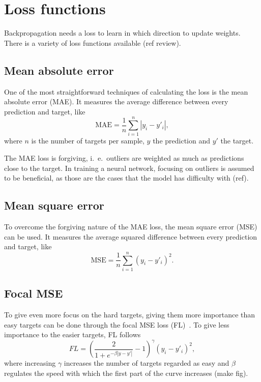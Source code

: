 
\section{Loss functions}
Backpropagation needs a loss to learn in which direction to update weights.
There is a variety of loss functions available (ref review).

\subsection{Mean absolute error}
One of the most straightforward techniques of calculating the loss is the mean absolute error (MAE).
It measures the average difference between every prediction and target, like
\begin{equation}
    \mathrm{MAE} = \frac{1}{n} \sum_{i=1}^{n} |y_i - y'_i|,
\end{equation}
where $n$ is the number of targets per sample, $y$ the prediction and $y'$ the target.

The MAE loss is forgiving, i.\ e.\ outliers are weighted as much as predictions close to the target.
In training a neural network, focusing on outliers is assumed to be beneficial, as those are the cases that the model has difficulty with (ref).

\subsection{Mean square error}
To overcome the forgiving nature of the MAE loss, the mean square error (MSE) can be used.
It measures the average squared difference between every prediction and target, like
\begin{equation}
    \mathrm{MSE} = \frac{1}{n} \sum_{i=1}^n (y_i - y'_i)^2.
\end{equation}

\subsection{Focal MSE}
To give even more focus on the hard targets, giving them more importance than easy targets can be done through the focal MSE loss (FL)~\cite{Lu2022}.
To give less importance to the easier targets, FL follows
\begin{equation}
    FL = \left(\frac{2}{1 + e^{-\beta |y - y'|}} - 1 \right)^\gamma (y_i - y'_i)^2,
\end{equation}
where increasing $\gamma$ increases the number of targets regarded as easy and $\beta$ regulates the speed with which the first part of the curve increases (make fig).

